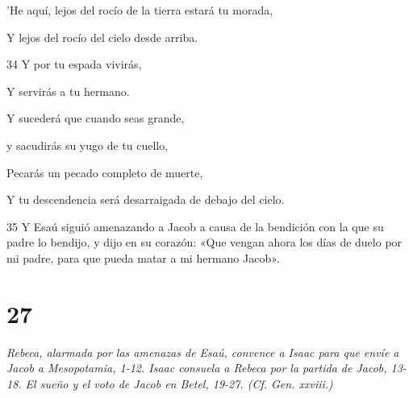 \par    
\par     'He aquí, lejos del rocío de la tierra estará tu morada,  
\par     Y lejos del rocío del cielo desde arriba.
\par    
\par 34 Y por tu espada vivirás,  
\par     Y servirás a tu hermano.
\par    
\par     Y sucederá que cuando seas grande,  
\par     y sacudirás su yugo de tu cuello,  
\par     Pecarás un pecado completo de muerte,  
\par     Y tu descendencia será desarraigada de debajo del cielo.
\par    
\par 35 Y Esaú siguió amenazando a Jacob a causa de la bendición con la que su padre lo bendijo, y dijo en su corazón: «Que vengan ahora los días de duelo por mi padre, para que pueda matar a mi hermano Jacob».

\chapter{27}

\par \textit{Rebeca, alarmada por las amenazas de Esaú, convence a Isaac para que envíe a Jacob a Mesopotamia, 1-12. Isaac consuela a Rebeca por la partida de Jacob, 13-18. El sueño y el voto de Jacob en Betel, 19-27. (Cf. Gen. xxviii.)}

